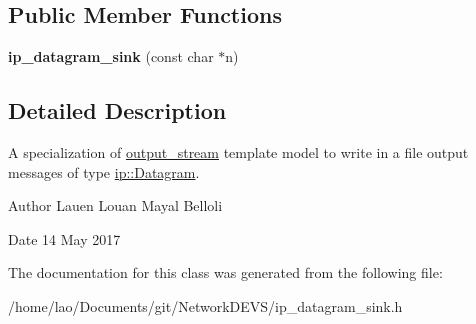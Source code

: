 \subsection*{Public Member Functions}
\begin{DoxyCompactItemize}
\item 
{\bfseries ip\+\_\+datagram\+\_\+sink} (const char $\ast$n)\hypertarget{classip__datagram__sink_a660e2f26390312a94d8e4a2fbc0e4614}{}\label{classip__datagram__sink_a660e2f26390312a94d8e4a2fbc0e4614}

\end{DoxyCompactItemize}


\subsection{Detailed Description}
A specialization of \hyperlink{classoutput__stream}{output\+\_\+stream} template model to write in a file output messages of type \hyperlink{structip_1_1Datagram}{ip\+::\+Datagram}. 

\begin{DoxyAuthor}{Author}
Lauen Louan Mayal Belloli 
\end{DoxyAuthor}
\begin{DoxyDate}{Date}
14 May 2017 
\end{DoxyDate}


The documentation for this class was generated from the following file\+:\begin{DoxyCompactItemize}
\item 
/home/lao/\+Documents/git/\+Network\+D\+E\+V\+S/ip\+\_\+datagram\+\_\+sink.\+h\end{DoxyCompactItemize}
